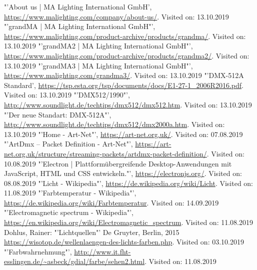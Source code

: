 \documentclass[11pt]{scrartcl}
\begin{document}
\begin{thebibliography}{xxxxxxxxxxxxxxxxxxx}
    "'About us | MA Lighting International GmbH', \url{https://www.malighting.com/company/about-us/}. Visited on: 13.10.2019
    "'grandMA | MA Lighting International GmbH"', \url{https://www.malighting.com/product-archive/products/grandma/}. Visited on: 13.10.2019
    "'grandMA2 | MA Lighting International GmbH"', \url{https://www.malighting.com/product-archive/products/grandma2/}. Visited on: 13.10.2019
    "'grandMA3 | MA Lighting International GmbH"', \url{https://www.malighting.com/grandma3/}. Visited on: 13.10.2019
    "'DMX-512A Standard', \url{https://tsp.esta.org/tsp/documents/docs/E1-27-1_2006R2016.pdf}. Visited on: 13.10.2019
    "'DMX512/1990"', \url{http://www.soundlight.de/techtips/dmx512/dmx512.htm}. Visited on: 13.10.2019
    "'Der neue Standart: DMX-512A"', \url{http://www.soundlight.de/techtips/dmx512/dmx2000a.htm}. Visited on: 13.10.2019
    "'Home - Art-Net"', \url{https://art-net.org.uk/}. Visited on: 07.08.2019
    "'ArtDmx – Packet Definition - Art-Net"', \url{https://art-net.org.uk/structure/streaming-packets/artdmx-packet-definition/}. Visited on: 10.08.2019
    "'Electron | Plattformübergreifende Desktop-Anwendungen mit JavaScript, HTML und CSS entwickeln."', \url{https://electronjs.org/}. Visited on: 08.08.2019
    "'Licht - Wikipedia"', \url{https://de.wikipedia.org/wiki/Licht}. Visited on: 11.08.2019
    "'Farbtemperatur - Wikipedia"', \url{https://de.wikipedia.org/wiki/Farbtemperatur}. Visited on: 14.09.2019
    "'Electromagnetic spectrum - Wikipedia"', \url{https://en.wikipedia.org/wiki/Electromagnetic_spectrum}. Visited on: 11.08.2019
     Dohlus, Rainer: "'Lichtquellen"' De Gruyter, Berlin, 2015
     \url{https://wisotop.de/wellenlaengen-des-lichts-farben.php}. Visited on: 03.10.2019
    "'Farbwahrnehmung"', \url{http://www.it.fht-esslingen.de/~asbeck/gdial/farbe/sehen2.html}. Visited on: 11.08.2019

\end{thebibliography}
\end{document}

